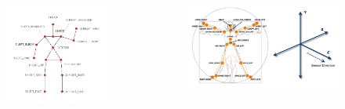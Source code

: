 \documentclass[8pt,sans,mathserif,aspectratio=43]{beamer}%
\begin{document}
\begin{frame}
    \begin{columns}
        \begin{figure}[t]
            \includegraphics[width=1.0\linewidth, keepaspectratio]{fig/openni-skeleton.png}
        \end{figure}
        \begin{figure}[t]
            \includegraphics[width=1.0\linewidth, keepaspectratio]{fig/kinect-joints.png}
        \end{figure}
    \end{columns}

\end{frame}
\end{document}
